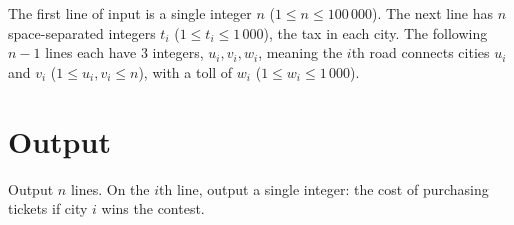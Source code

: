 The first line of input is a single integer $n$ ($1 \leq n \leq 100\,000$). The
next line has $n$ space-separated integers $t_i$ ($1\leq t_i \leq 1\,000$), the
tax in each city. The following $n - 1$ lines each have $3$ integers, $u_i,
v_i, w_i$, meaning the $i$th road connects cities $u_i$ and $v_i$ ($1 \le u_i,
v_i \le n$), with a toll of $w_i$ ($1 \leq w_i \leq 1\,000$).

\section*{Output}

Output $n$ lines. On the $i$th line, output a single integer: the cost of
purchasing tickets if city $i$ wins the contest.
